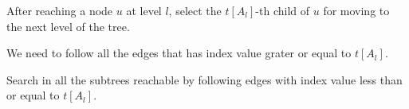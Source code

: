 \vspace{1mm}
 After reaching a node $u$ at level $l$, select the $t[A_l]$-th child of $u$ for moving to the next level of the tree.

\vspace{1mm}
 We need to follow all the edges that has index value grater or equal to $t[A_l]$.

\vspace{1mm}
 Search in all the subtrees reachable by following edges with index value less than or equal to $t[A_l]$.